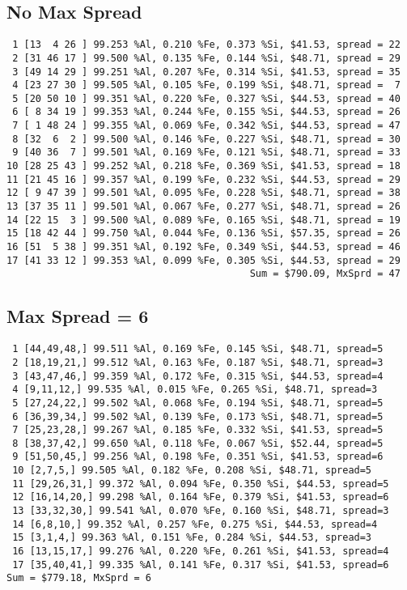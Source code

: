\documentclass{article}
\begin{document}
\subsection{No Max Spread}
\begin{verbatim}
 1 [13  4 26 ] 99.253 %Al, 0.210 %Fe, 0.373 %Si, $41.53, spread = 22
 2 [31 46 17 ] 99.500 %Al, 0.135 %Fe, 0.144 %Si, $48.71, spread = 29
 3 [49 14 29 ] 99.251 %Al, 0.207 %Fe, 0.314 %Si, $41.53, spread = 35
 4 [23 27 30 ] 99.505 %Al, 0.105 %Fe, 0.199 %Si, $48.71, spread =  7
 5 [20 50 10 ] 99.351 %Al, 0.220 %Fe, 0.327 %Si, $44.53, spread = 40
 6 [ 8 34 19 ] 99.353 %Al, 0.244 %Fe, 0.155 %Si, $44.53, spread = 26
 7 [ 1 48 24 ] 99.355 %Al, 0.069 %Fe, 0.342 %Si, $44.53, spread = 47
 8 [32  6  2 ] 99.500 %Al, 0.146 %Fe, 0.227 %Si, $48.71, spread = 30
 9 [40 36  7 ] 99.501 %Al, 0.169 %Fe, 0.121 %Si, $48.71, spread = 33
10 [28 25 43 ] 99.252 %Al, 0.218 %Fe, 0.369 %Si, $41.53, spread = 18
11 [21 45 16 ] 99.357 %Al, 0.199 %Fe, 0.232 %Si, $44.53, spread = 29
12 [ 9 47 39 ] 99.501 %Al, 0.095 %Fe, 0.228 %Si, $48.71, spread = 38
13 [37 35 11 ] 99.501 %Al, 0.067 %Fe, 0.277 %Si, $48.71, spread = 26
14 [22 15  3 ] 99.500 %Al, 0.089 %Fe, 0.165 %Si, $48.71, spread = 19
15 [18 42 44 ] 99.750 %Al, 0.044 %Fe, 0.136 %Si, $57.35, spread = 26
16 [51  5 38 ] 99.351 %Al, 0.192 %Fe, 0.349 %Si, $44.53, spread = 46
17 [41 33 12 ] 99.353 %Al, 0.099 %Fe, 0.305 %Si, $44.53, spread = 29
                                          Sum = $790.09, MxSprd = 47
\end{verbatim}

\subsection{Max Spread = 6}
\begin{verbatim}
 1 [44,49,48,] 99.511 %Al, 0.169 %Fe, 0.145 %Si, $48.71, spread=5
 2 [18,19,21,] 99.512 %Al, 0.163 %Fe, 0.187 %Si, $48.71, spread=3
 3 [43,47,46,] 99.359 %Al, 0.172 %Fe, 0.315 %Si, $44.53, spread=4
 4 [9,11,12,] 99.535 %Al, 0.015 %Fe, 0.265 %Si, $48.71, spread=3
 5 [27,24,22,] 99.502 %Al, 0.068 %Fe, 0.194 %Si, $48.71, spread=5
 6 [36,39,34,] 99.502 %Al, 0.139 %Fe, 0.173 %Si, $48.71, spread=5
 7 [25,23,28,] 99.267 %Al, 0.185 %Fe, 0.332 %Si, $41.53, spread=5
 8 [38,37,42,] 99.650 %Al, 0.118 %Fe, 0.067 %Si, $52.44, spread=5
 9 [51,50,45,] 99.256 %Al, 0.198 %Fe, 0.351 %Si, $41.53, spread=6
 10 [2,7,5,] 99.505 %Al, 0.182 %Fe, 0.208 %Si, $48.71, spread=5
 11 [29,26,31,] 99.372 %Al, 0.094 %Fe, 0.350 %Si, $44.53, spread=5
 12 [16,14,20,] 99.298 %Al, 0.164 %Fe, 0.379 %Si, $41.53, spread=6
 13 [33,32,30,] 99.541 %Al, 0.070 %Fe, 0.160 %Si, $48.71, spread=3
 14 [6,8,10,] 99.352 %Al, 0.257 %Fe, 0.275 %Si, $44.53, spread=4
 15 [3,1,4,] 99.363 %Al, 0.151 %Fe, 0.284 %Si, $44.53, spread=3
 16 [13,15,17,] 99.276 %Al, 0.220 %Fe, 0.261 %Si, $41.53, spread=4
 17 [35,40,41,] 99.335 %Al, 0.141 %Fe, 0.317 %Si, $41.53, spread=6
Sum = $779.18, MxSprd = 6 
\end{verbatim}
\end{document}
